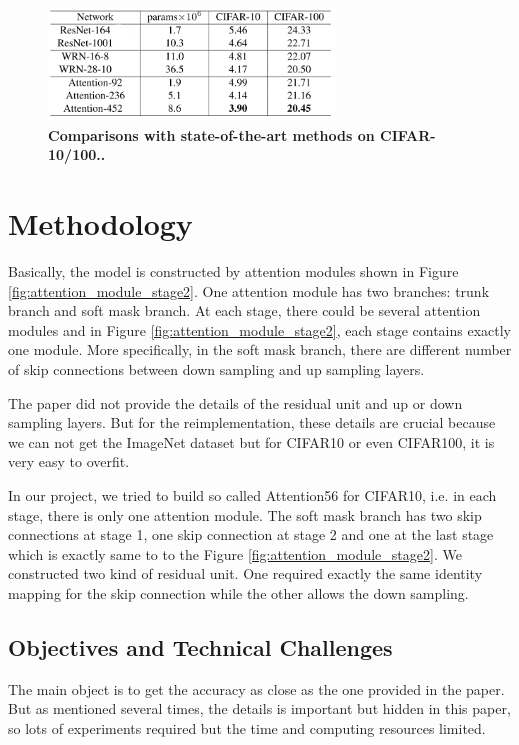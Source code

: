 \documentclass{article}
\newcommand{\mycaption}[2]{\caption[#1]{\textbf{#1.} #2}}
\begin{document}
\begin{multicols}{2}
\begin{figure}[H] 
\includegraphics[width=3in]{imgs/cifar10_modes}  
\mycaption{Comparisons with state-of-the-art methods on CIFAR-10/100.}{}
\label{fig:cifar10_modes}
\end{figure}

\section{Methodology}
Basically, the model is constructed by attention modules shown in Figure \ref{fig:attention_module_stage2}. One attention module has two branches: trunk branch and soft mask branch. At each stage, there could be several attention modules and in Figure \ref{fig:attention_module_stage2}, each stage contains exactly one module. More specifically, in the soft mask branch, there are different number of skip connections between down sampling and up sampling layers. 

The paper did not provide the details of the residual unit and up or down sampling layers. But for the reimplementation, these details are crucial because we can not get the ImageNet dataset but for CIFAR10 or even CIFAR100, it is very easy to overfit. 

In our project, we tried to build so called Attention56 for CIFAR10, i.e. in each stage, there is only one attention module. The soft mask branch has two skip connections at stage 1, one skip connection at stage 2 and one at the last stage which is exactly same to to the Figure \ref{fig:attention_module_stage2}. We constructed two kind of residual unit. One required exactly the same identity mapping for the skip connection while the other allows the down sampling.  
 
\subsection{Objectives and Technical Challenges}
The main object is to get the accuracy as close as the one provided in the paper. But as mentioned several times, the details is important but hidden in this paper, so lots of experiments required but the time and computing resources limited. 


\end{multicols}
\end{document}
